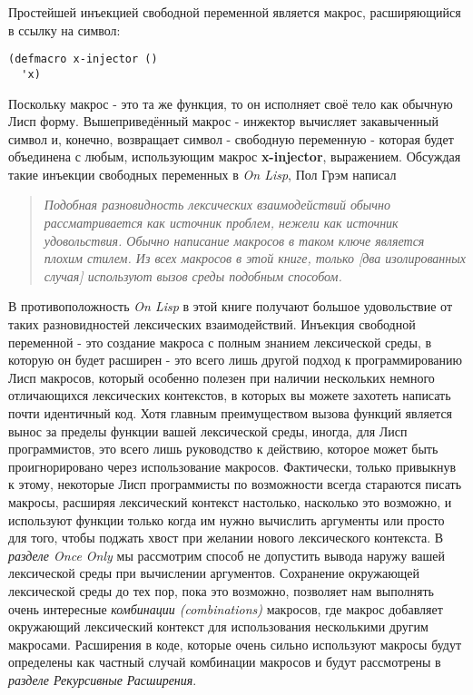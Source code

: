 Простейшей инъекцией свободной переменной является макрос, расширяющийся в ссылку на символ:

\begin{verbatim}
(defmacro x-injector ()
  'x)
\end{verbatim}

Поскольку макрос - это та же функция, то он исполняет своё тело как обычную Лисп форму. Вышеприведённый макрос - инжектор вычисляет закавыченный символ и, конечно, возвращает символ - свободную переменную - которая будет объединена с любым, использующим макрос \textbf{x-injector}, выражением. Обсуждая такие инъекции свободных переменных в \emph{On Lisp}, Пол Грэм написал

\begin{quote}
\emph{Подобная разновидность лексических взаимодействий обычно рассматривается как источник проблем, нежели как источник удовольствия. Обычно написание макросов в таком ключе является плохим стилем. Из всех макросов в этой книге, только [два изолированных случая] используют вызов среды подобным способом.}
\end{quote}

В противоположность \emph{On Lisp} в этой книге получают большое удовольствие от таких разновидностей лексических взаимодействий. Инъекция свободной переменной - это создание макроса с полным знанием лексической среды, в которую он будет расширен - это всего лишь другой подход к программированию Лисп макросов, который особенно полезен при наличии нескольких немного отличающихся лексических контекстов, в которых вы можете захотеть написать почти идентичный код. Хотя главным преимуществом вызова функций является вынос за пределы функции вашей лексической среды, иногда, для Лисп программистов, это всего лишь руководство к действию, которое может быть проигнорировано через использование макросов. Фактически, только привыкнув к этому, некоторые Лисп программисты по возможности всегда стараются писать макросы, расширяя лексический контекст настолько, насколько это возможно, и используют функции только когда им нужно вычислить аргументы или просто для того, чтобы поджать хвост при желании нового лексического контекста. В \emph{разделе Once Only} мы рассмотрим способ не допустить вывода наружу вашей лексической среды при вычислении аргументов. Сохранение окружающей лексической среды до тех пор, пока это возможно, позволяет нам выполнять очень интересные \emph{комбинации (combinations)} макросов, где макрос добавляет окружающий лексический контекст для использования несколькими другим макросами. Расширения в коде, которые очень сильно используют макросы будут определены как частный случай комбинации макросов и будут рассмотрены в \emph{разделе Рекурсивные Расширения}.

